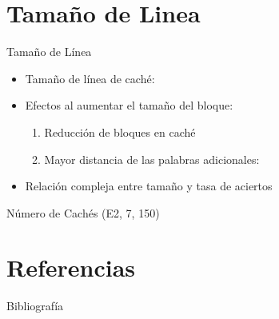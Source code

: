 \documentclass[presentation]{beamer}
\begin{document}
\section{Tamaño de Linea}
\label{sec:org37f9158}
\begin{frame}[allowframebreaks]{Tamaño de Línea}
\begin{itemize}
\item Tamaño de línea de caché:
\item Efectos al aumentar el tamaño del bloque:
\begin{enumerate}
\item Reducción de bloques en caché
\item Mayor distancia de las palabras adicionales:
\end{enumerate}
\item Relación compleja entre tamaño y tasa de aciertos
\end{itemize}
\end{frame}
\begin{frame}[label={sec:org7600033}]{Número de Cachés (E2, 7, 150)}
\end{frame}


\section{Referencias}
\label{sec:orgb7127eb}
\begin{frame}[allowframebreaks]{Bibliografía}
\printbibliography
\end{frame}
\end{document}
